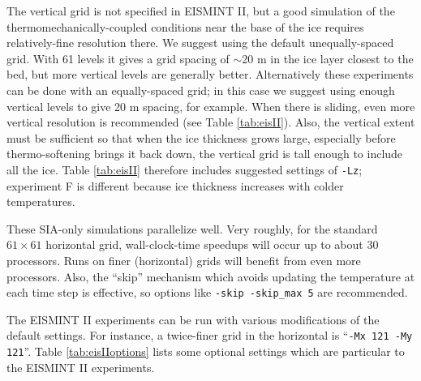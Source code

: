 The vertical grid is not specified in EISMINT II, but a good simulation of the thermomechanically-coupled conditions near the base of the ice requires relatively-fine resolution there.  We suggest using the default unequally-spaced grid.  With 61 levels it gives a grid spacing of $\sim$20 m in the ice layer closest to the bed, but more vertical levels are generally better.  Alternatively these experiments can be done with an equally-spaced grid; in this case we suggest using enough vertical levels to give 20 m spacing, for example.  When there is sliding, even more vertical resolution is recommended (see Table \ref{tab:eisII}).  Also, the vertical extent must be sufficient so that when the ice thickness grows large, especially before thermo-softening brings it back down, the vertical grid is tall enough to include all the ice.  Table \ref{tab:eisII} therefore includes suggested settings of \texttt{-Lz}; experiment F is different because ice thickness increases with colder temperatures.

These SIA-only simulations parallelize well.  Very roughly, for the standard $61\times 61$ horizontal grid, wall-clock-time speedups will occur up to about 30 processors.  Runs on finer (horizontal) grids will benefit from even more processors.  Also, the ``skip'' mechanism which avoids updating the temperature at each time step is effective, so options like \texttt{-skip -skip_max 5} are recommended.

The EISMINT II experiments can be run with various modifications of the default settings.  For instance, a twice-finer grid in the horizontal is ``\texttt{-Mx 121 -My 121}''.  Table \ref{tab:eisIIoptions} lists some optional settings which are particular to the EISMINT II experiments.


